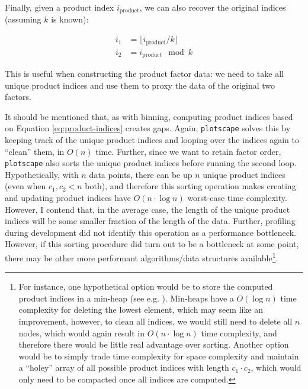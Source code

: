 \documentclass[
  openany]{book}
\theoremstyle{definition}
\theoremstyle{definition}
\theoremstyle{definition}
\theoremstyle{definition}
\theoremstyle{remark}
\begin{document}
Finally, given a product index \(i_{\text{product}}\), we can also recover the original indices (assuming \(k\) is known):

\begin{align}
i_1 &= \lfloor i_{\text{product}} / k \rfloor \\
i_2 &= i_{\text{product}} \mod k
\end{align}

This is useful when constructing the product factor data: we need to take all unique product indices and use them to proxy the data of the original two factors.

It should be mentioned that, as with binning, computing product indices based on Equation \eqref{eq:product-indices} creates gaps. Again, \texttt{plotscape} solves this by keeping track of the unique product indices and looping over the indices again to ``clean'' them, in \(O(n)\) time. Further, since we want to retain factor order, \texttt{plotscape} also sorts the unique product indices before running the second loop. Hypothetically, with \(n\) data points, there can be up \(n\) unique product indices (even when \(c_1, c_2 < n\) both), and therefore this sorting operation makes creating and updating product indices have \(O(n \cdot \log n)\) worst-case time complexity. However, I contend that, in the average case, the length of the unique product indices will be some smaller fraction of the length of the data. Further, profiling during development did not identify this operation as a performance bottleneck. However, if this sorting procedure did turn out to be a bottleneck at some point, there may be other more performant algorithms/data structures available\footnote{For instance, one hypothetical option would be to store the computed product indices in a min-heap (see e.g. ). Min-heaps have a \(O(\log n)\) time complexity for deleting the lowest element, which may seem like an improvement, however, to clean all indices, we would still need to delete all \(n\) nodes, which would again result in \(O(n \cdot \log n)\) time complexity, and therefore there would be little real advantage over sorting. Another option would be to simply trade time complexity for space complexity and maintain a ``holey'' array of all possible product indices with length \(c_1 \cdot c_2\), which would only need to be compacted once all indices are computed.}.
\end{document}
